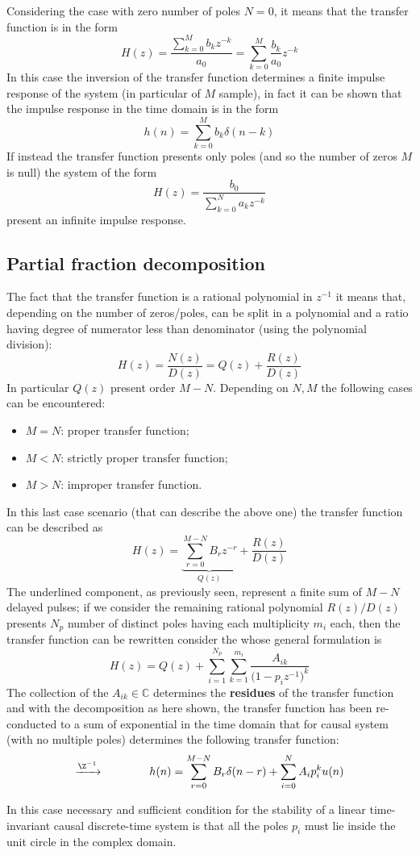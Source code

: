 	Considering the case with zero number of poles $N=0$, it means that the transfer function is in the form
	\[ H(z) = \frac{\sum_{k=0}^M b_k z^{-k}}{a_0} = \sum_{k=0}^M \frac{b_k}{a_0} z^{-k} \]
	In this case the inversion of the transfer function determines a finite impulse response of the system (in particular of $M$ sample), in fact it can be shown that the impulse response in the time domain is in the form
	\[ h(n) = \sum_{k=0}^M b_k \delta(n-k) \] 
	If instead the transfer function presents only poles (and so the number of zeros $M$ is null) the system of the form
	\[ H(z) = \frac{b_0}{\sum_{k=0}^N a_k z^{-k}} \]
	present an infinite impulse response.
	
\subsection{Partial fraction decomposition}
	The fact that the transfer function is a rational polynomial in $z^{-1}$ it means that, depending on the number of zeros/poles, can be split in a polynomial and a ratio having degree of numerator less than denominator (using the polynomial division):
	\[ H(z) = \frac{N(z)}{D(z)} = Q(z) + \frac{R(z)}{D(z)} \]
	In particular $Q(z)$ present order $M-N$. Depending on $N,M$ the following cases can be encountered:
	\begin{itemize}
		\item $M=N$: proper transfer function;
		\item $M<N$: strictly proper transfer function;
		\item $M>N$: improper transfer function.
	\end{itemize}
	In this last case scenario (that can describe the above one) the transfer function can be described as
	\[ H(z) = \underbrace{\sum_{r=0}^{M-N} B_r z^{-r} }_{Q(z)} + \frac{R(z)}{D(z)} \]
	The underlined component, as previously seen, represent a finite sum of $M-N$ delayed pulses; if we consider the remaining rational polynomial $R(z)/D(z)$ presents $N_p$ number of distinct poles having each multiplicity $m_i$ each, then the transfer function can be rewritten consider the  whose general formulation is
	\[ H(z) = Q(z) + \sum_{i=1}^{N_p} \sum_{k=1}^{m_i} \frac{A_{ik}}{\big(1-p_i z^{-1}\big)^k} \]	
	The collection of the $A_{ik} \in \mathds C$ determines the \textbf{residues} of the transfer function and with the decomposition as here shown, the transfer function has been re-conducted to a sum of exponential in the time domain that for causal system (with no multiple poles) determines the following transfer function:
	\begin{equation}
		\xrightarrow{\Z^{-1}} \qquad \qquad h(n) = \sum_{r=0}^{M-N} B_r \delta(n-r) + \sum_{i=0}^N A_i p_i^k u(n)
	\end{equation}
	
	In this case necessary and sufficient condition for the stability of a linear time-invariant causal discrete-time system is that all the poles $p_i$ must lie inside the unit circle in the complex domain.
	
	
	
	
	
	
	
	
	
	
	
	
	
	
	
	
	
	
	
	
	
	
	
	
	
	
	